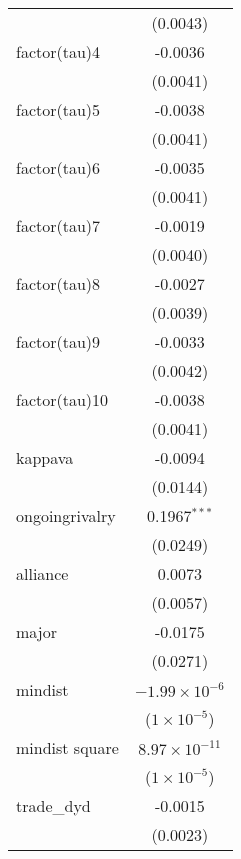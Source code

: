 \begin{tabular}{lc}
                                   & (0.0043)\\   
   factor(tau)4                    & -0.0036\\   
                                   & (0.0041)\\   
   factor(tau)5                    & -0.0038\\   
                                   & (0.0041)\\   
   factor(tau)6                    & -0.0035\\   
                                   & (0.0041)\\   
   factor(tau)7                    & -0.0019\\   
                                   & (0.0040)\\   
   factor(tau)8                    & -0.0027\\   
                                   & (0.0039)\\   
   factor(tau)9                    & -0.0033\\   
                                   & (0.0042)\\   
   factor(tau)10                   & -0.0038\\   
                                   & (0.0041)\\   
   kappava                         & -0.0094\\   
                                   & (0.0144)\\   
   ongoingrivalry                  & 0.1967$^{***}$\\   
                                   & (0.0249)\\   
   alliance                        & 0.0073\\   
                                   & (0.0057)\\   
   major                           & -0.0175\\   
                                   & (0.0271)\\   
   mindist                         & $-1.99\times 10^{-6}$\\    
                                   & ($1\times 10^{-5}$)\\    
   mindist square                  & $8.97\times 10^{-11}$\\    
                                   & ($1\times 10^{-5}$)\\    
   trade\_dyd                      & -0.0015\\   
                                   & (0.0023)\\   

\end{tabular}
